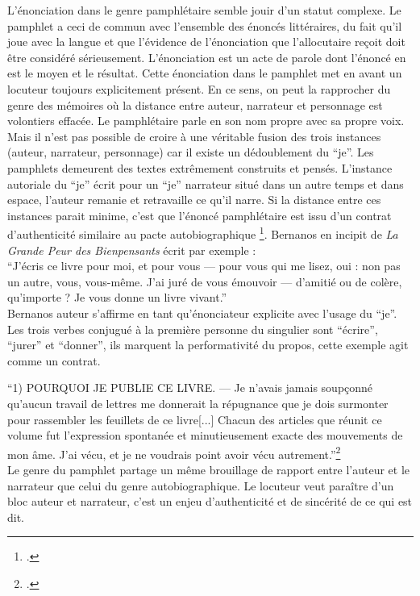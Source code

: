 L'énonciation dans le genre pamphlétaire semble jouir d'un statut complexe. Le pamphlet a ceci de commun avec l'ensemble des énoncés littéraires, du fait qu'il joue avec la langue et que l'évidence de l'énonciation que l'allocutaire reçoit doit être considéré sérieusement.  L'énonciation est un acte de parole dont l'énoncé en est le moyen et le résultat. Cette énonciation dans le pamphlet met en avant un locuteur toujours explicitement présent. En ce sens, on peut la rapprocher du genre des mémoires où la distance entre auteur, narrateur et personnage est volontiers effacée. Le pamphlétaire parle en son nom propre avec sa propre voix. Mais il n'est pas possible de croire à une véritable fusion des trois instances (auteur, narrateur, personnage) car il existe un dédoublement du \enquote{je}. Les pamphlets demeurent des textes extrêmement construits et pensés. L'instance autoriale du \enquote{je} écrit pour un \enquote{je} narrateur situé dans un autre temps et dans espace, l'auteur remanie et retravaille ce qu'il narre. Si la distance entre ces instances parait minime, c'est que l'énoncé pamphlétaire est issu d'un contrat d'authenticité similaire au pacte autobiographique \footcites{lejeune_pacte_1975}. Bernanos en incipit de \textit{La Grande Peur des Bienpensants} écrit par exemple : \\
	
	\enquote{J'écris ce livre pour moi, et pour vous — pour vous qui me lisez, oui : non pas un autre, vous, vous-même. J'ai juré de vous émouvoir — d'amitié ou de colère, qu'importe ? Je vous donne un livre vivant.}\\

Bernanos auteur s'affirme en tant qu'énonciateur explicite avec l'usage du \enquote{je}. Les trois verbes conjugué à la première personne du singulier sont \enquote{écrire}, \enquote{jurer} et \enquote{donner}, ils marquent la performativité du propos, cette exemple agit comme un contrat.

	\enquote{1) POURQUOI JE PUBLIE CE LIVRE. — Je n'avais jamais soupçonné qu'aucun travail de lettres me donnerait la répugnance que je dois surmonter pour rassembler les feuillets de ce livre[...] Chacun des articles que réunit ce volume fut l'expression spontanée et minutieusement exacte des mouvements de mon âme. J'ai vécu, et je ne voudrais point avoir vécu autrement.}\footcites{barres_scenes_1902}\\


Le genre du pamphlet partage un même brouillage de rapport entre l'auteur et le narrateur que celui du genre autobiographique. Le locuteur veut paraître d'un bloc auteur et narrateur, c'est un enjeu d'authenticité et de sincérité de ce qui est dit.\\

